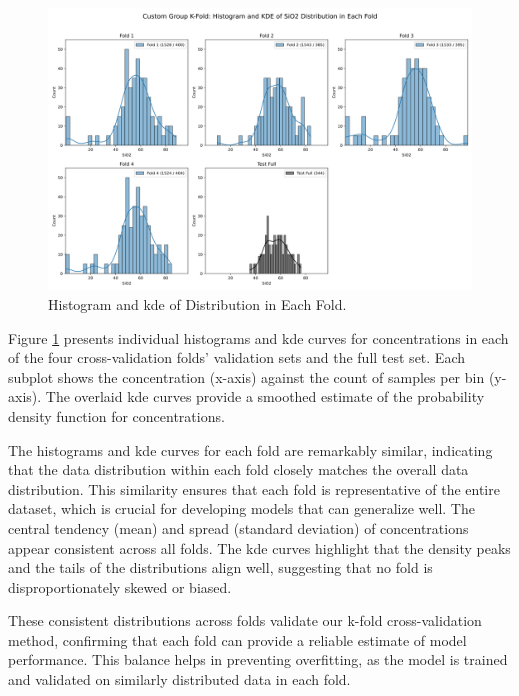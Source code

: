 \begin{figure}[h!]
    \centering
    \includegraphics[width=\textwidth]{images/histogram_grid_plot.png}
    \caption{Histogram and \gls{kde} of  Distribution in Each Fold.}
    \label{fig:histogram_grid_plot}
\end{figure}

Figure \ref{fig:histogram_grid_plot} presents individual histograms and \gls{kde} curves for  concentrations in each of the four cross-validation folds' validation sets and the full test set.
Each subplot shows the  concentration (x-axis) against the count of samples per bin (y-axis).
The overlaid \gls{kde} curves provide a smoothed estimate of the probability density function for  concentrations.

The histograms and \gls{kde} curves for each fold are remarkably similar, indicating that the data distribution within each fold closely matches the overall data distribution.
This similarity ensures that each fold is representative of the entire dataset, which is crucial for developing models that can generalize well.
The central tendency (mean) and spread (standard deviation) of  concentrations appear consistent across all folds.
The \gls{kde} curves highlight that the density peaks and the tails of the distributions align well, suggesting that no fold is disproportionately skewed or biased.

These consistent distributions across folds validate our k-fold cross-validation method, confirming that each fold can provide a reliable estimate of model performance.
This balance helps in preventing overfitting, as the model is trained and validated on similarly distributed data in each fold.

